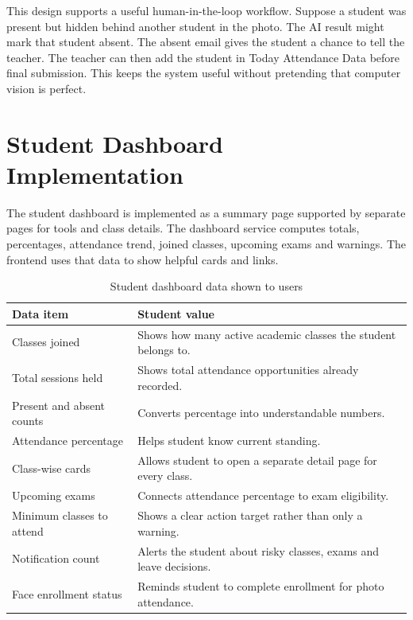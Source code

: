 This design supports a useful human-in-the-loop workflow. Suppose a student was present but hidden behind another student in the photo. The AI result might mark that student absent. The absent email gives the student a chance to tell the teacher. The teacher can then add the student in Today Attendance Data before final submission. This keeps the system useful without pretending that computer vision is perfect.

\section{Student Dashboard Implementation}

The student dashboard is implemented as a summary page supported by separate pages for tools and class details. The dashboard service computes totals, percentages, attendance trend, joined classes, upcoming exams and warnings. The frontend uses that data to show helpful cards and links.

\begin{table}[H]
\centering
\caption{Student dashboard data shown to users}
\label{tab:student-dashboard-data}
\begin{tabularx}{\textwidth}{p{3.5cm} X}
\toprule
\textbf{Data item} & \textbf{Student value}\\
\midrule
Classes joined & Shows how many active academic classes the student belongs to.\\
Total sessions held & Shows total attendance opportunities already recorded.\\
Present and absent counts & Converts percentage into understandable numbers.\\
Attendance percentage & Helps student know current standing.\\
Class-wise cards & Allows student to open a separate detail page for every class.\\
Upcoming exams & Connects attendance percentage to exam eligibility.\\
Minimum classes to attend & Shows a clear action target rather than only a warning.\\
Notification count & Alerts the student about risky classes, exams and leave decisions.\\
Face enrollment status & Reminds student to complete enrollment for photo attendance.\\
\bottomrule
\end{tabularx}
\end{table}


